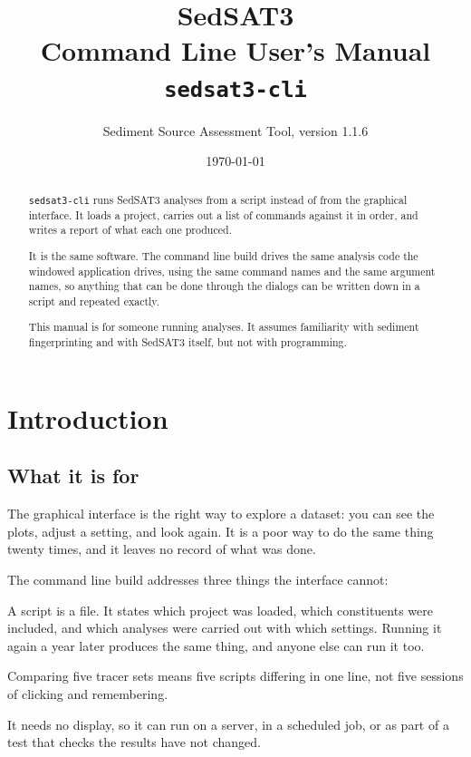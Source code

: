 \documentclass[11pt,a4paper]{report}
\title{\Huge SedSAT3 \\[0.3cm]
       \Large Command Line User's Manual \\[0.6cm]
       \large \texttt{sedsat3-cli}}
\author{Sediment Source Assessment Tool, version 1.1.6}
\date{\today}
\begin{document}
\maketitle

\begin{abstract}
\noindent
\texttt{sedsat3-cli} runs SedSAT3 analyses from a script instead of from the
graphical interface. It loads a project, carries out a list of commands against
it in order, and writes a report of what each one produced.

It is the same software. The command line build drives the same analysis code
the windowed application drives, using the same command names and the same
argument names, so anything that can be done through the dialogs can be
written down in a script and repeated exactly.

This manual is for someone running analyses. It assumes familiarity with
sediment fingerprinting and with SedSAT3 itself, but not with programming.
\end{abstract}

\tableofcontents

\chapter{Introduction}

\section{What it is for}

The graphical interface is the right way to explore a dataset: you can see the
plots, adjust a setting, and look again. It is a poor way to do the same thing
twenty times, and it leaves no record of what was done.

The command line build addresses three things the interface cannot:

\begin{description}[style=nextline,leftmargin=0pt]
  \item[A run you can repeat] A script is a file. It states which project was
    loaded, which constituents were included, and which analyses were carried
    out with which settings. Running it again a year later produces the same
    thing, and anyone else can run it too.
  \item[A run you can vary] Comparing five tracer sets means five scripts
    differing in one line, not five sessions of clicking and remembering.
  \item[A run you can automate] It needs no display, so it can run on a server,
    in a scheduled job, or as part of a test that checks the results have not
    changed.
\end{description}
\end{document}
